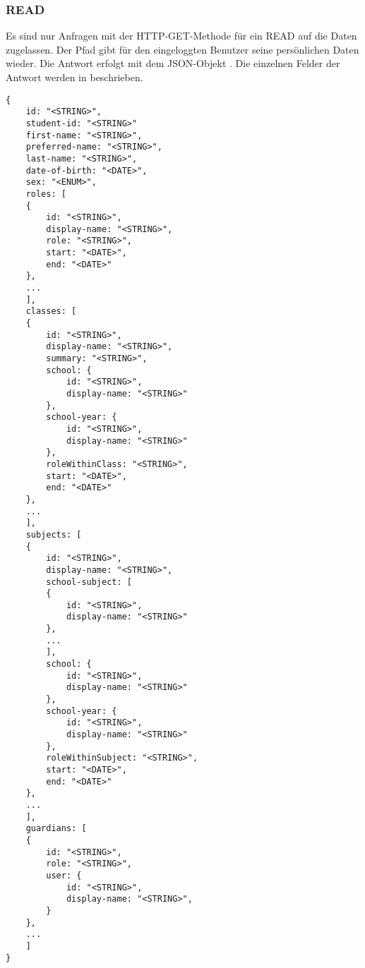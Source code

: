 \subsubsection{READ}
\label{sec:rest:api:user:read}
Es sind nur Anfragen mit der HTTP-GET-Methode für ein READ auf die Daten zugelassen.
Der Pfad gibt für den eingeloggten Benutzer seine persönlichen Daten wieder.
Die Antwort erfolgt mit dem JSON-Objekt . 
Die einzelnen Felder der Antwort werden in  beschrieben.

\begin{lstlisting}[caption={JSON-Antwort für einen GET-Aufruf des Pfads /api/users},label={lst:code:rest:api:user:read:ret},frame=tlrb]
{
	id: "<STRING>",
	student-id: "<STRING>"
 	first-name: "<STRING>",
 	preferred-name: "<STRING>",
 	last-name: "<STRING>",
 	date-of-birth: "<DATE>",
 	sex: "<ENUM>",
 	roles: [
 	{
 		id: "<STRING>",
 		display-name: "<STRING>",
 		role: "<STRING>",
 		start: "<DATE>",
 		end: "<DATE>"
 	},
 	...
 	],
 	classes: [
 	{
 		id: "<STRING>",
 		display-name: "<STRING>",
 		summary: "<STRING>",
 		school: {
 			id: "<STRING>",
 			display-name: "<STRING>"
 		},
 		school-year: {
 			id: "<STRING>",
 			display-name: "<STRING>"
 		},
 		roleWithinClass: "<STRING>",
 		start: "<DATE>",
 		end: "<DATE>"
 	},
 	...
	],
	subjects: [
	{
		id: "<STRING>",
		display-name: "<STRING>",
		school-subject: [
 		{
 			id: "<STRING>",
 			display-name: "<STRING>"
 		},
 		...
 		],
 		school: {
 			id: "<STRING>",
 			display-name: "<STRING>"
 		},
 		school-year: {
 			id: "<STRING>",
 			display-name: "<STRING>"
 		},
 		roleWithinSubject: "<STRING>",
 		start: "<DATE>",
 		end: "<DATE>" 		
	},
	...
	],
	guardians: [
	{
		id: "<STRING>",
		role: "<STRING>",
		user: {
			id: "<STRING>",
			display-name: "<STRING>",
		}
	},
	...
	]
}
\end{lstlisting}

